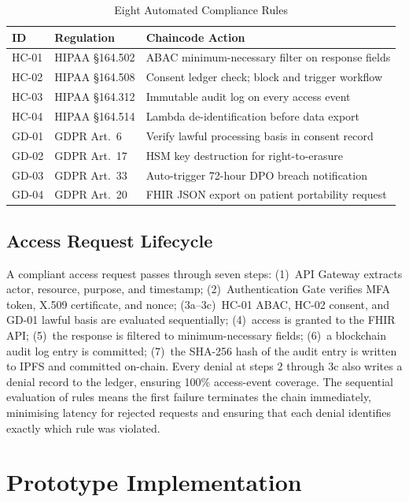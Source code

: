 \documentclass[10pt,twocolumn,a4paper]{article}
\begin{document}
\begin{table}[t]
\centering
\caption{Eight Automated Compliance Rules}
\label{tab:rules}
\scriptsize
\setlength{\tabcolsep}{3pt}
\begin{tabular}{C{0.55cm} L{1.2cm} L{4.7cm}}
\toprule
\textbf{ID} & \textbf{Regulation} & \textbf{Chaincode Action} \\
\midrule
HC-01 & HIPAA \S164.502 & ABAC minimum-necessary filter on response fields \\
HC-02 & HIPAA \S164.508 & Consent ledger check; block and trigger workflow \\
HC-03 & HIPAA \S164.312 & Immutable audit log on every access event \\
HC-04 & HIPAA \S164.514 & Lambda de-identification before data export \\
GD-01 & GDPR Art.\ 6   & Verify lawful processing basis in consent record \\
GD-02 & GDPR Art.\ 17  & HSM key destruction for right-to-erasure \\
GD-03 & GDPR Art.\ 33  & Auto-trigger 72-hour DPO breach notification \\
GD-04 & GDPR Art.\ 20  & FHIR JSON export on patient portability request \\
\bottomrule
\end{tabular}
\end{table}

\subsection{Access Request Lifecycle}

A compliant access request passes through seven steps: (1)~API Gateway
extracts actor, resource, purpose, and timestamp; (2)~Authentication
Gate verifies MFA token, X.509 certificate, and nonce; (3a--3c)~HC-01
ABAC, HC-02 consent, and GD-01 lawful basis are evaluated sequentially;
(4)~access is granted to the FHIR API; (5)~the response is filtered to
minimum-necessary fields; (6)~a blockchain audit log entry is committed;
(7)~the SHA-256 hash of the audit entry is written to IPFS and
committed on-chain. Every denial at steps 2 through 3c also writes a
denial record to the ledger, ensuring 100\% access-event coverage.
The sequential evaluation of rules means the first failure terminates
the chain immediately, minimising latency for rejected requests and
ensuring that each denial identifies exactly which rule was violated.

\section{Prototype Implementation}
\end{document}
